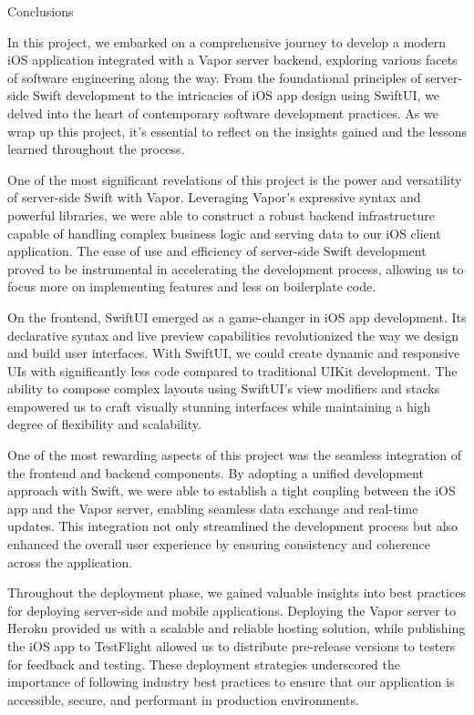 \documentclass[
  biblatex,
  language=english,
  figures=false,
  sourcecodes,
  glossaries,
  index
]{kidiplom}
\begin{document}
\begin{kiconclusions}
Conclusions

In this project, we embarked on a comprehensive journey to develop a modern iOS application integrated with a Vapor server backend, exploring various facets of software engineering along the way. From the foundational principles of server-side Swift development to the intricacies of iOS app design using SwiftUI, we delved into the heart of contemporary software development practices. As we wrap up this project, it's essential to reflect on the insights gained and the lessons learned throughout the process.

One of the most significant revelations of this project is the power and versatility of server-side Swift with Vapor. Leveraging Vapor's expressive syntax and powerful libraries, we were able to construct a robust backend infrastructure capable of handling complex business logic and serving data to our iOS client application. The ease of use and efficiency of server-side Swift development proved to be instrumental in accelerating the development process, allowing us to focus more on implementing features and less on boilerplate code.

On the frontend, SwiftUI emerged as a game-changer in iOS app development. Its declarative syntax and live preview capabilities revolutionized the way we design and build user interfaces. With SwiftUI, we could create dynamic and responsive UIs with significantly less code compared to traditional UIKit development. The ability to compose complex layouts using SwiftUI's view modifiers and stacks empowered us to craft visually stunning interfaces while maintaining a high degree of flexibility and scalability.

One of the most rewarding aspects of this project was the seamless integration of the frontend and backend components. By adopting a unified development approach with Swift, we were able to establish a tight coupling between the iOS app and the Vapor server, enabling seamless data exchange and real-time updates. This integration not only streamlined the development process but also enhanced the overall user experience by ensuring consistency and coherence across the application.

Throughout the deployment phase, we gained valuable insights into best practices for deploying server-side and mobile applications. Deploying the Vapor server to Heroku provided us with a scalable and reliable hosting solution, while publishing the iOS app to TestFlight allowed us to distribute pre-release versions to testers for feedback and testing. These deployment strategies underscored the importance of following industry best practices to ensure that our application is accessible, secure, and performant in production environments.


\end{kiconclusions}
\end{document}
